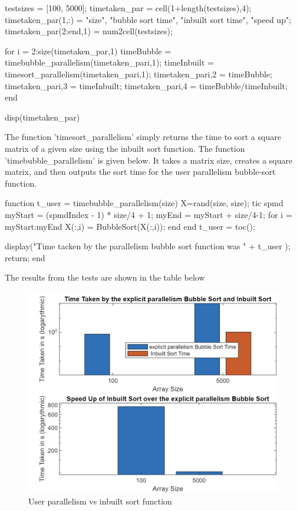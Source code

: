 \begin{Matlab}
 testsizes = [100, 5000];
 timetaken_par = cell(1+length(testsizes),4);
 timetaken_par(1,:) = {"size", "bubble sort time", "inbuilt sort time", "speed up"};
 timetaken_par(2:end,1) = num2cell(testsizes); 

 for i = 2:size(timetaken_par,1)
  timeBubble = timebubble_parallelism(timetaken_par{i,1});
  timeInbuilt = timesort_parallelism(timetaken_par{i,1});
  timetaken_par{i,2} = timeBubble;
  timetaken_par{i,3} = timeInbuilt;
  timetaken_par{i,4} = timeBubble/timeInbuilt;
 end

 disp(timetaken_par)
\end{Matlab}

The function 'timesort\_parallelism' simply returns the time to sort a square matrix of a given size using the inbuilt sort function.
The function 'timebubble\_parallelism' is given below.
It takes a matrix size, creates a square matrix, and then outputs the sort time for the user parallelism bubble-sort function.

\begin{Matlab}
function t_user = timebubble_parallelism(size)
    X=rand(size, size);
    tic
    spmd
        myStart = (spmdIndex - 1) * size/4 + 1;
        myEnd = myStart + size/4-1; 
        for i = myStart:myEnd
            X(:,i) = BubbleSort(X(:,i));
        end
    end
    t_user = toc();
    
    display("Time tacken by the parallelism bubble sort function was " + t_user );
    return;
end
\end{Matlab}

The results from the tests are shown in the table below


\begin{figure}[H]
 \centering
 \includegraphics[width=0.6\columnwidth]{Figures/expPar_2}
 \caption{User parallelism vs inbuilt sort function}
 \label{fig:expPar}
\end{figure}


